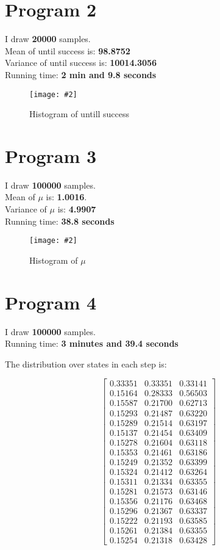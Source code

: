 \documentclass{article}
\newcommand{\centerfigcap}[3]{\begin{figure}[H]
\begin{center}\texttt{[image: \#2]} \caption{#3}\end{center}
\end{figure}}
\begin{document}
\pagebreak
\section{Program 2}
I draw \textbf{20000} samples.\\
Mean of until success is: \textbf{98.8752}\\
Variance of until success is: \textbf{10014.3056}\\
Running time: \textbf{2 min and 9.8 seconds}

\centerfigcap{1}{../Results/fig2}{Histogram of untill success}

\pagebreak
\section{Program 3}
I draw \textbf{100000} samples.\\
Mean of $\mu$ is: \textbf{1.0016}.\\
Variance of $\mu$ is: \textbf{4.9907}\\
Running time: \textbf{38.8 seconds}

\centerfigcap{1}{../Results/fig3}{Histogram of $\mu$}

\pagebreak
\section{Program 4}
I draw \textbf{100000} samples.\\
Running time: \textbf{3 minutes and 39.4 seconds}

The distribution over states in each step is:

\[ \begin{bmatrix}
0.33351 & 0.33351 & 0.33141\\
0.15164 & 0.28333 & 0.56503\\
0.15587 & 0.21700 & 0.62713\\
0.15293 & 0.21487 & 0.63220\\
0.15289 & 0.21514 & 0.63197\\
0.15137 & 0.21454 & 0.63409\\
0.15278 & 0.21604 & 0.63118\\
0.15353 & 0.21461 & 0.63186\\
0.15249 & 0.21352 & 0.63399\\
0.15324 & 0.21412 & 0.63264\\
0.15311 & 0.21334 & 0.63355\\
0.15281 & 0.21573 & 0.63146\\
0.15356 & 0.21176 & 0.63468\\
0.15296 & 0.21367 & 0.63337\\
0.15222 & 0.21193 & 0.63585\\
0.15261 & 0.21384 & 0.63355\\
0.15254 & 0.21318 & 0.63428
\end{bmatrix} \]
\end{document}

